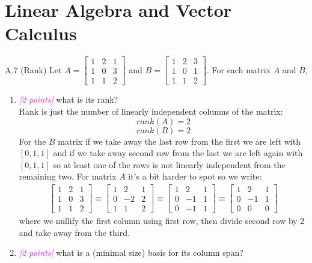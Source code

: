 \documentclass{article}
\newcommand{\1}{\mathbf{1}}
\newcommand{\points}[1]{\small\textcolor{magenta}{\emph{[#1 points]}} \normalsize}
\begin{document}
\newpage
\section*{Linear Algebra and Vector Calculus}
A.7 (Rank) Let $A = \begin{bmatrix} 1 & 2 & 1 \\ 1 & 0 & 3 \\ 1 & 1 & 2 \end{bmatrix}$ and $B = \begin{bmatrix} 1 & 2 & 3 \\ 1 & 0 & 1 \\ 1 & 1 & 2 \end{bmatrix}$.
For each matrix $A$ and $B$,
\begin{enumerate} 
	\item \points{2} what is its rank?  \\
	
	Rank is just the number of linearly independent columns of the matrix:
	$$rank(A) = 2$$
	$$rank(B) = 2$$
	For the $B$ matrix if we take away the last row from the first we are left with $[0,1, 1]$ and if we take away second row from the last we are left again with $[0, 1, 1]$ so at least one of the rows is not linearly independent from the remaining two. For matrix $A$ it's a bit harder to spot so we write:
	\begin{align*}
	\begin{bmatrix} 1 & 2 & 1 \\ 1 & 0 & 3 \\ 1 & 1 & 2 \end{bmatrix} \equiv 
	\begin{bmatrix} 1 & 2 & 1 \\ 0 & -2 & 2 \\ 1 & 1 & 2\end{bmatrix} \equiv
	\begin{bmatrix} 1 & 2 & 1 \\ 0 & -1 & 1 \\ 0 & -1 & 1\end{bmatrix} \equiv
	\begin{bmatrix} 1 & 2 & 1 \\ 0 & -1 & 1 \\ 0 & 0 & 0\end{bmatrix}
	\end{align*}
	where we nullify the first column using first row, then divide second row by 2 and take away from the third.
	
	\item \points{2} what is a (minimal size) basis for its column span? \\
	

\end{enumerate}
\end{document}
